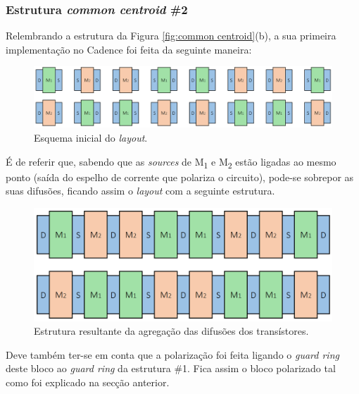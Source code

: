 \documentclass[11pt]{article}
\numberwithin{equation}{section}
\begin{document}
\subsubsection{Estrutura \textit{common centroid} \#2}

Relembrando a estrutura da Figura \ref{fig:common centroid}(b), a sua primeira implementação no Cadence foi feita da seguinte maneira:

\begin{figure}[H]
	\centering
	\includegraphics[keepaspectratio=true, scale=0.30]{teoricas/layout/cc2_1}
	\vspace{-0.5em}
	\caption{Esquema inicial do \textit{layout}.}
	\vspace{-0.8em} 
\end{figure}

É de referir que, sabendo que as \textit{sources} de M\textsubscript{1} e M\textsubscript{2} estão ligadas ao mesmo ponto (saída do espelho de corrente que polariza o circuito), pode-se sobrepor as suas difusões, ficando assim o \textit{layout} com a seguinte estrutura.

\begin{figure}[H]
	\centering
	\includegraphics[keepaspectratio=true, scale=0.30]{teoricas/layout/cc2_2}
	\vspace{-0.5em}
	\caption{Estrutura resultante da agregação das difusões dos transístores.}
	\vspace{-0.8em} 
\end{figure}

Deve também ter-se em conta que a polarização foi feita ligando o \textit{guard ring} deste bloco ao \textit{guard ring} da estrutura \#1. Fica assim o bloco polarizado tal como foi explicado na secção anterior.
\end{document}
